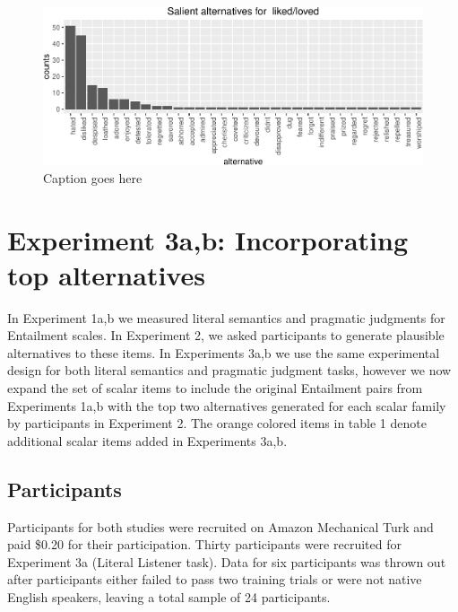 \documentclass[10pt, letterpaper]{article}
\newenvironment{CodeChunk}{}{}
\begin{document}
\begin{CodeChunk}
\captionsetup{width=0.8\textwidth}\begin{figure}[t]

{\centering \includegraphics{figs/exp2_altsPlot_likedLoved-1} 

}

\caption[Caption goes here]{Caption goes here}\label{fig:exp2_altsPlot_likedLoved}
\end{figure}
\end{CodeChunk}

\section{Experiment 3a,b: Incorporating top
alternatives}\label{experiment-3ab-incorporating-top-alternatives}

In Experiment 1a,b we measured literal semantics and pragmatic judgments
for Entailment scales. In Experiment 2, we asked participants to
generate plausible alternatives to these items. In Experiments 3a,b we
use the same experimental design for both literal semantics and
pragmatic judgment tasks, however we now expand the set of scalar items
to include the original Entailment pairs from Experiments 1a,b with the
top two alternatives generated for each scalar family by participants in
Experiment 2. The orange colored items in table 1 denote additional
scalar items added in Experiments 3a,b.

\subsection{Participants}\label{participants-2}

Participants for both studies were recruited on Amazon Mechanical Turk
and paid \$0.20 for their participation. Thirty participants were
recruited for Experiment 3a (Literal Listener task). Data for six
participants was thrown out after participants either failed to pass two
training trials or were not native English speakers, leaving a total
sample of 24 participants.
\end{document}
